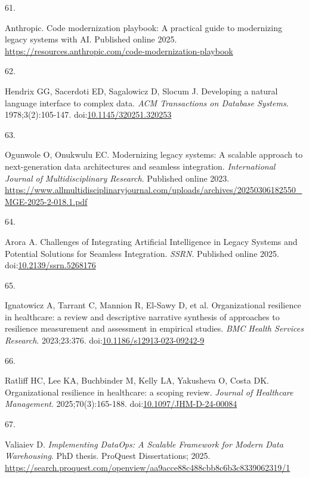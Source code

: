 \documentclass[
  american,
  11pt,
  letterpaper,
  oneside  ,captions=tableheading
]{scrartcl}
\newlength{\cslhangindent}
\newlength{\csllabelwidth}
\newenvironment{CSLReferences}[2] %
 {\begin{list}{}{%
  \setlength{\itemindent}{0pt}
  \setlength{\leftmargin}{0pt}
  \setlength{\parsep}{0pt}
  \ifodd #1
   \setlength{\leftmargin}{\cslhangindent}
   \setlength{\itemindent}{-1\cslhangindent}
  \fi
  \setlength{\itemsep}{#2\baselineskip}}}
 {\end{list}}
\newcommand{\CSLLeftMargin}[1]{\parbox[t]{\csllabelwidth}{\strut#1\strut}}
\newcommand{\CSLRightInline}[1]{\parbox[t]{\linewidth - \csllabelwidth}{\strut#1\strut}}
\begin{document}
\begin{CSLReferences}{0}{1}
\CSLLeftMargin{61. }%
\CSLRightInline{Anthropic. {Code modernization playbook: A practical
guide to modernizing legacy systems with {AI}}. Published online 2025.
\url{https://resources.anthropic.com/code-modernization-playbook}}

\CSLLeftMargin{62. }%
\CSLRightInline{Hendrix GG, Sacerdoti ED, Sagalowicz D, Slocum J.
{Developing a natural language interface to complex data}. \emph{{ACM}
Transactions on Database Systems}. 1978;3(2):105-147.
doi:\href{https://doi.org/10.1145/320251.320253}{10.1145/320251.320253}}

\CSLLeftMargin{63. }%
\CSLRightInline{Ogunwole O, Onukwulu EC. {Modernizing legacy systems: A
scalable approach to next-generation data architectures and seamless
integration}. \emph{International Journal of Multidisciplinary
Research}. Published online 2023.
\url{https://www.allmultidisciplinaryjournal.com/uploads/archives/20250306182550_MGE-2025-2-018.1.pdf}}

\CSLLeftMargin{64. }%
\CSLRightInline{Arora A. {Challenges of Integrating Artificial
Intelligence in Legacy Systems and Potential Solutions for Seamless
Integration}. \emph{{SSRN}}. Published online 2025.
doi:\href{https://doi.org/10.2139/ssrn.5268176}{10.2139/ssrn.5268176}}

\CSLLeftMargin{65. }%
\CSLRightInline{{Ignatowicz A, Tarrant C, Mannion R, El-Sawy D, et al.}
{Organizational resilience in healthcare: a review and descriptive
narrative synthesis of approaches to resilience measurement and
assessment in empirical studies}. \emph{BMC Health Services Research}.
2023;23:376.
doi:\href{https://doi.org/10.1186/s12913-023-09242-9}{10.1186/s12913-023-09242-9}}

\CSLLeftMargin{66. }%
\CSLRightInline{Ratliff HC, Lee KA, Buchbinder M, Kelly LA, Yakusheva O,
Costa DK. {Organizational resilience in healthcare: a scoping review}.
\emph{Journal of Healthcare Management}. 2025;70(3):165-188.
doi:\href{https://doi.org/10.1097/JHM-D-24-00084}{10.1097/JHM-D-24-00084}}

\CSLLeftMargin{67. }%
\CSLRightInline{Valiaiev D. \emph{{Implementing DataOps: A Scalable
Framework for Modern Data Warehousing}}. PhD thesis. ProQuest
Dissertations; 2025.
\url{https://search.proquest.com/openview/aa9acce88c488cbb8c6b3c8339062319/1}}


\end{CSLReferences}
\end{document}
